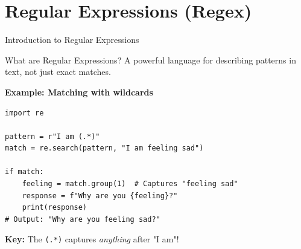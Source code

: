\documentclass[aspectratio=169]{beamer}
\begin{document}
\section{Regular Expressions (Regex)}

\begin{frame}[fragile]{Introduction to Regular Expressions 🎯}
\begin{block}{What are Regular Expressions?}
A powerful language for describing patterns in text, not just exact matches.
\end{block}

\vspace{0.3cm}

\textbf{Example: Matching with wildcards}

\begin{lstlisting}
import re

pattern = r"I am (.*)"
match = re.search(pattern, "I am feeling sad")

if match:
    feeling = match.group(1)  # Captures "feeling sad"
    response = f"Why are you {feeling}?"
    print(response)
# Output: "Why are you feeling sad?"
\end{lstlisting}

\vspace{0.3cm}

\textbf{Key: } The \texttt{(.*)} captures \textit{anything} after "I am"!
\end{frame}
\end{document}
